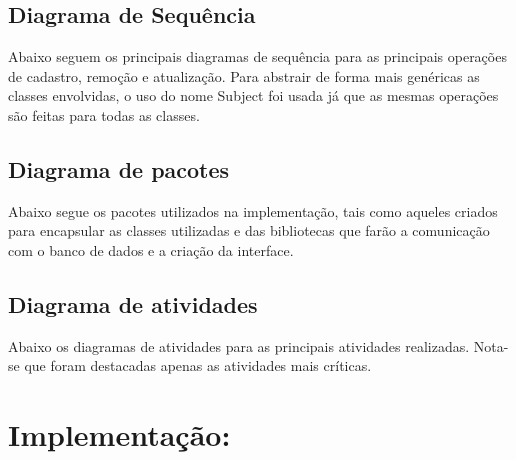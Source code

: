 \documentclass[a4paper,10pt]{article}
\begin{document}


\subsection{Diagrama de Sequência}


Abaixo seguem os principais diagramas de sequência para as principais operações de cadastro, remoção e atualização. Para abstrair de forma mais genéricas as classes envolvidas, o uso do nome Subject foi usada já que as mesmas operações são feitas para todas as classes.


\subsection{Diagrama de pacotes}

Abaixo segue os pacotes utilizados na implementação, tais como aqueles criados para encapsular as classes utilizadas e das bibliotecas que farão a comunicação com o banco de dados e a criação da interface.


\subsection{Diagrama de atividades}

Abaixo os diagramas de atividades para as principais atividades realizadas. Nota-se que foram destacadas apenas as atividades mais críticas.


\section{Implementação:}
\end{document}
